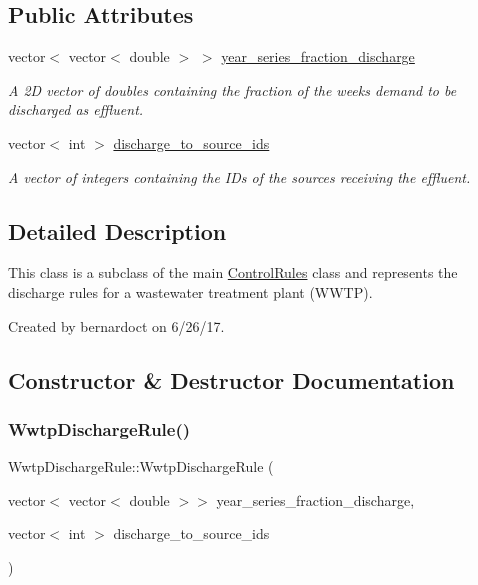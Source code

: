 \subsection*{Public Attributes}
\begin{DoxyCompactItemize}
\item 
vector$<$ vector$<$ double $>$ $>$ \mbox{\hyperlink{classWwtpDischargeRule_a5d193e0cbc2eb23e1b86e79fb2eafad3}{year\+\_\+series\+\_\+fraction\+\_\+discharge}}
\begin{DoxyCompactList}\small\item\em A 2D vector of doubles containing the fraction of the week\textquotesingle{}s demand to be discharged as effluent. \end{DoxyCompactList}\item 
vector$<$ int $>$ \mbox{\hyperlink{classWwtpDischargeRule_ac2f77a9fca93eef3fd26ff1d579130be}{discharge\+\_\+to\+\_\+source\+\_\+ids}}
\begin{DoxyCompactList}\small\item\em A vector of integers containing the I\+Ds of the sources receiving the effluent. \end{DoxyCompactList}\end{DoxyCompactItemize}


\subsection{Detailed Description}
This class is a subclass of the main {\ttfamily \mbox{\hyperlink{classControlRules}{Control\+Rules}}} class and represents the discharge rules for a wastewater treatment plant (W\+W\+TP). 

Created by bernardoct on 6/26/17. 

\subsection{Constructor \& Destructor Documentation}
\mbox{\label{classWwtpDischargeRule_ae904657855c9d983ea0e5995109cd561}} 
\subsubsection{\texorpdfstring{Wwtp\+Discharge\+Rule()}{WwtpDischargeRule()}\hspace{0.1cm}{\footnotesize\ttfamily [1/2]}}
{\footnotesize\ttfamily Wwtp\+Discharge\+Rule\+::\+Wwtp\+Discharge\+Rule (\begin{DoxyParamCaption}\item[{vector$<$ vector$<$ double $>$$>$}]{year\+\_\+series\+\_\+fraction\+\_\+discharge,  }\item[{vector$<$ int $>$}]{discharge\+\_\+to\+\_\+source\+\_\+ids }\end{DoxyParamCaption})}



